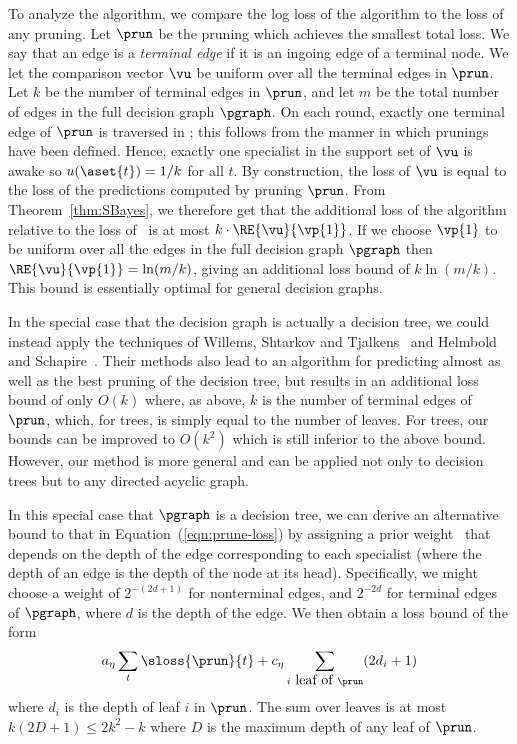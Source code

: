 To analyze the algorithm,
we compare the log loss of the
algorithm to the loss of any pruning.
Let $\prun$ be the pruning which achieves the smallest total loss.
We say that an edge is a {\em terminal edge\/} if it is an ingoing
edge of a terminal node.
We let the comparison vector $\vu$ be uniform over all the terminal edges
in $\prun$. Let $k$ be the number of terminal edges in $\prun$,
and let $m$ be the total number
of edges in the full decision graph $\pgraph$.
On each round, exactly one terminal edge of $\prun$
is traversed in \pgraph; this follows from the manner in which
prunings have been defined.
Hence, exactly one specialist in the support set of $\vu$ is awake so
$u(\aset{t})=1/k$ for all $t$.
By construction,
the loss of $\vu$ is equal to the loss
of the predictions computed by pruning $\prun$.  From 
Theorem~\ref{thm:SBayes}, 
we therefore get that the additional loss of the
algorithm relative to the loss of \prun\ is at most $k\cdot
\RE{\vu}{\vp{1}}$.
If we choose $\vp{1}$ to be uniform over all the edges in the full
decision graph $\pgraph$ then $\RE{\vu}{\vp{1}} = \ln(m/k)$,
giving an additional loss bound of $k \ln(m/k)$.
This bound is essentially optimal for general decision graphs.

In the special case that the decision graph is actually a decision
tree, we could instead apply
the techniques of Willems, Shtarkov and Tjalkens~\cite{WillemsShTj95} and
Helmbold and Schapire~\cite{HelmboldSc95}.
Their methods also lead to an algorithm for predicting almost as well
as the best pruning
of the decision tree, but
results in an additional loss bound of only $O(k)$
where, as above, $k$ is the number of terminal edges of $\prun$,
which, for trees, is simply equal to the number of leaves.
For trees, our bounds can be improved to $O(k^2)$ which is still
inferior to the above bound. However, our method is more general
and can be applied not only to decision trees but to any directed
acyclic graph.

\iffalse
For the special case of trees the additional loss
of our algorithm can be improved to $O(k^2)$ by choosing
a different prior.
\note{MW: tagged on a sentence which I  dont feel strongly about}
\fi

\iffalse
In this special case that $\pgraph$ is a decision tree, we can derive
an alternative bound to that in Equation~(\ref{eqn:prune-loss}) by
assigning a prior weight \ that depends on the depth of the
edge corresponding to each specialist (where the depth of an edge is
the depth of the node at its head).
Specifically, we might choose a weight of $2^{-(2d+1)}$ for
nonterminal edges, and $2^{-2d}$ for terminal edges of $\pgraph$, where
$d$ is the depth of the edge.
We then obtain a loss bound of
the form
\[a_\eta \sum_{t} \sloss{\prun}{t} + c_\eta
      \sum_{i \mbox{~leaf of~} \prun} (2d_i+1)\]
where $d_i$ is the depth of leaf $i$ in $\prun$.
The sum over leaves is at most $k(2D+1) \leq 2k^2 - k$ where $D$ is
the maximum depth of any leaf of $\prun$.

